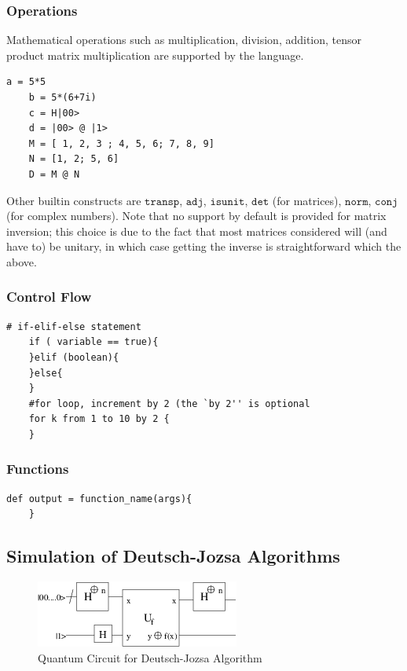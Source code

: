 \documentclass[11pt]{article}
\begin{document}
\subsubsection{Operations}\label{ssec:operations}
Mathematical operations such as multiplication, division, addition, tensor product matrix multiplication are supported by the language.
\begin{lstlisting}[frame=single]
	a = 5*5
 	b = 5*(6+7i)
	c = H|00>
  	d = |00> @ |1>
	M = [ 1, 2, 3 ; 4, 5, 6; 7, 8, 9]
	N = [1, 2; 5, 6]
	D = M @ N
\end{lstlisting}
Other builtin constructs are $\texttt{transp}$, $\texttt{adj}$, $\texttt{isunit}$, $\texttt{det}$ (for matrices), $\texttt{norm}$, $\texttt{conj}$ (for complex numbers). Note that no support by default is provided for matrix inversion; this choice is due to the fact that most matrices considered will (and have to) be unitary, in which case getting the inverse is straightforward which the above.

\subsubsection{Control Flow}

\begin{lstlisting}[frame=single]
	# if-elif-else statement
	if ( variable == true){
	}elif (boolean){
	}else{
	}
	#for loop, increment by 2 (the `by 2'' is optional
	for k from 1 to 10 by 2 {
	}
\end{lstlisting}
		
\subsubsection{Functions}

\begin{lstlisting}[frame=single]
	def output = function_name(args){
	}
\end{lstlisting}
	
\subsection{Simulation of Deutsch-Jozsa Algorithms} 

\begin{figure}
\begin{center}
\includegraphics{deutschjozsa}
\end{center}
\caption{ Quantum Circuit for Deutsch-Jozsa Algorithm
\label{m42}}
\end{figure}
\end{document}
